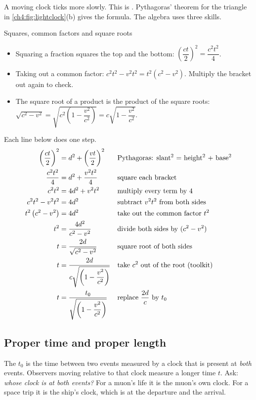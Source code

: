 A moving clock ticks more slowly. This is . Pythagoras' theorem for the
triangle in \cref{ch4:fig:lightclock}(b) gives the formula. The algebra uses three skills.

\begin{toolkit}{Squares, common factors and square roots}
\begin{itemize}
  \item Squaring a fraction squares the top and the bottom:
        $\left(\dfrac{ct}{2}\right)^2 = \dfrac{c^2t^2}{4}$.
  \item Taking out a common factor: $c^2t^2 - v^2t^2 = t^2\left(c^2 - v^2\right)$. Multiply the
        bracket out again to check.
  \item The square root of a product is the product of the square roots:
        $\sqrt{c^2 - v^2} = \sqrt{c^2\left(1 - \dfrac{v^2}{c^2}\right)}
        = c\sqrt{1 - \dfrac{v^2}{c^2}}$.
\end{itemize}
\end{toolkit}

Each line below does one step.
\begin{align}
  \left(\frac{ct}{2}\right)^2 &= d^2 + \left(\frac{vt}{2}\right)^2
    && \text{Pythagoras: slant$^2$ = height$^2$ + base$^2$}\notag\\
  \frac{c^2t^2}{4} &= d^2 + \frac{v^2t^2}{4} && \text{square each bracket}\notag\\
  c^2t^2 &= 4d^2 + v^2t^2 && \text{multiply every term by 4}\notag\\
  c^2t^2 - v^2t^2 &= 4d^2 && \text{subtract $v^2t^2$ from both sides}\notag\\
  t^2\left(c^2 - v^2\right) &= 4d^2 && \text{take out the common factor $t^2$}\notag\\
  t^2 &= \frac{4d^2}{c^2 - v^2} && \text{divide both sides by $(c^2 - v^2)$}\notag\\
  t &= \frac{2d}{\sqrt{c^2 - v^2}} && \text{square root of both sides}\notag\\
  t &= \frac{2d}{c\sqrt{\left(1 - \dfrac{v^2}{c^2}\right)}}
    && \text{take $c^2$ out of the root (toolkit)}\notag\\
  t &= \frac{t_0}{\sqrt{\left(1 - \dfrac{v^2}{c^2}\right)}}
    && \text{replace $\dfrac{2d}{c}$ by $t_0$}\label{ch4:eq:dilation}
\end{align}

\subsection{Proper time and proper length}
The  $t_0$ is the time between two events measured by a clock that is present
at \emph{both} events. Observers moving relative to that clock measure a longer time $t$. Ask:
\emph{whose clock is at both events?} For a muon's life it is the muon's own clock. For a space
trip it is the ship's clock, which is at the departure and the arrival.

